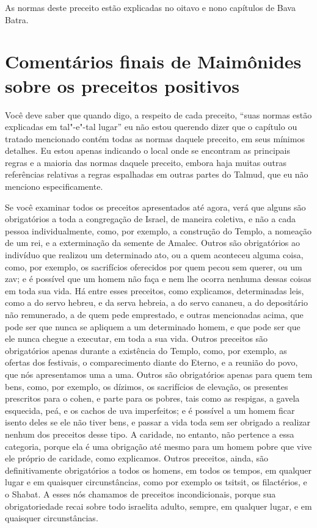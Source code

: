 \begin{multicols}{2}
As normas deste preceito estão explicadas no oitavo e nono capítulos de
Bava Batra\starr.

\section{Comentários finais de Maimônides sobre os preceitos positivos}

Você deve saber que quando digo, a respeito de cada preceito, ``suas
normas estão explicadas em tal"-e"-tal lugar'' eu não estou querendo dizer
que o capítulo ou tratado mencionado contém todas as normas daquele
preceito, em seus mínimos detalhes. Eu estou apenas indicando o local
onde se encontram as principais regras e a maioria das normas daquele
preceito, embora haja muitas outras referências relativas a regras
espalhadas em outras partes do Talmud\starr, que eu não menciono
especificamente.

Se você examinar todos os preceitos apresentados até agora, verá que
alguns são obrigatórios a toda a congregação de Israel, de maneira
coletiva, e não a cada pessoa individualmente, como, por exemplo, a
construção do Templo, a nomeação de um rei, e a exterminação da semente
de Amalec\starr. Outros são obrigatórios ao indivíduo que realizou um
determinado ato, ou a quem aconteceu alguma coisa, como, por exemplo,
os sacrifícios oferecidos por quem pecou sem querer, ou um zav\starr; e é
possível que um homem não faça e nem lhe ocorra nenhuma dessas coisas em
toda sua vida. Há entre esses preceitos, como explicamos, determinadas
leis, como a do servo hebreu, e da serva hebreia, a do servo cananeu, a
do depositário não remunerado, a de quem pede emprestado, e outras
mencionadas acima, que pode ser que nunca se apliquem a um determinado
homem, e que pode ser que ele nunca chegue a executar, em toda a sua
vida. Outros preceitos são obrigatórios apenas durante a existência do
Templo, como, por exemplo, as ofertas dos festivais, o comparecimento
diante do Eterno, e a reunião do povo, que nós apresentamos uma a uma.
Outros são obrigatórios apenas para quem tem bens, como, por exemplo,
os dízimos, os sacrifícios de elevação, os presentes prescritos para o
cohen\starr, e parte para os pobres, tais como as respigas, a gavela
esquecida, peá\starr, e os cachos de uva imperfeitos; e é possível a um
homem ficar isento deles se ele não tiver bens, e passar a vida toda sem
ser obrigado a realizar nenhum dos preceitos desse tipo. A caridade, no
entanto, não pertence a essa categoria, porque ela é uma obrigação até
mesmo para um homem pobre que vive ele próprio de caridade, como
explicamos. Outros preceitos, ainda, são definitivamente obrigatórios a todos os homens, em todos os tempos, em qualquer lugar e em
quaisquer circunstâncias, como por exemplo os tsitsit\starr, os
filactérios, e o Shabat. A esses nós chamamos de preceitos
incondicionais, porque sua obrigatoriedade recai sobre todo israelita
adulto, sempre, em qualquer lugar, e em quaisquer circunstâncias.


\end{multicols}
